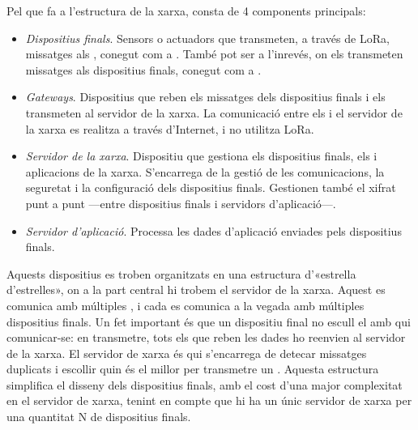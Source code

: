 \documentclass{tfgitic}[2024/07/01]
\begin{document}
Pel que fa a l'estructura de la xarxa, consta de 4 components principals:
\begin{itemize}
    \item \emph{Dispositius finals}. Sensors o actuadors que transmeten, a través de LoRa, missatges als , conegut com a . També pot ser a l'inrevés, on els  transmeten missatges als dispositius finals, conegut com a .  
    \item \emph{Gateways}. Dispositius que reben els missatges dels dispositius finals i els transmeten al servidor de la xarxa. La comunicació entre els  i el servidor de la xarxa es realitza a través d'Internet, i no utilitza LoRa. 
    \item \emph{Servidor de la xarxa}. Dispositiu que gestiona els dispositius finals, els  i aplicacions de la xarxa. S'encarrega de la gestió de les comunicacions, la seguretat i la configuració dels dispositius finals. Gestionen també el xifrat punt a punt ---entre dispositius finals i servidors d'aplicació---.
    \item \emph{Servidor d'aplicació}. Processa les dades d'aplicació enviades pels dispositius finals.
\end{itemize}
Aquests dispositius es troben organitzats en una estructura d'«estrella d'estrelles», on a la part central hi trobem el servidor de la xarxa. Aquest es comunica amb múltiples , i cada  es comunica a la vegada amb múltiples dispositius finals. 
Un fet important és que un dispositiu final no escull el  amb qui comunicar-se: en transmetre, tots els  que reben les dades ho reenvien al servidor de la xarxa. El servidor de xarxa és qui s'encarrega de detecar missatges duplicats i escollir quin és el millor  per transmetre un . Aquesta estructura simplifica el disseny dels dispositius finals, amb el cost d'una major complexitat en el servidor de xarxa, tenint en compte que hi ha un únic servidor de xarxa per una quantitat N de dispositius finals.
\end{document}
